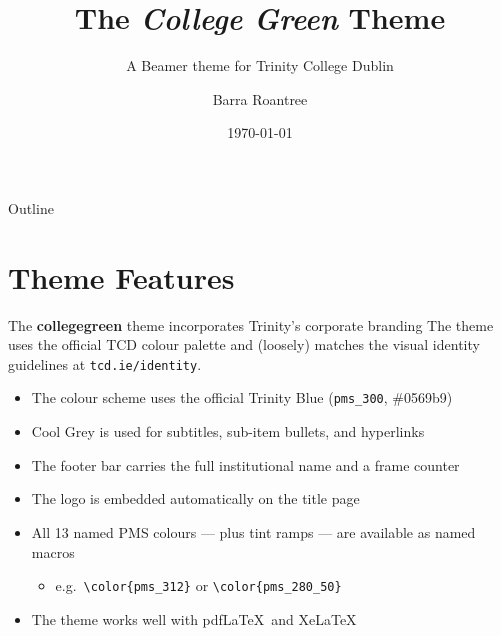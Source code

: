 \documentclass[aspectratio=169]{beamer}
\title{The \textit{College Green} Theme}
\subtitle{A Beamer theme for Trinity College Dublin}
\institute{Trinity College Dublin, the University of Dublin}
\author{Barra Roantree}
\date{\today}
\begin{document}
{
\begin{frame}
\titlepage
\end{frame}
}

\begin{frame}{Outline}
\tableofcontents
\end{frame}

\section{Theme Features}

\begin{frame}{The \textbf{collegegreen} theme incorporates Trinity's corporate branding}
The theme uses the official TCD colour palette and (loosely) matches the visual identity
guidelines at \texttt{tcd.ie/identity}.

\begin{itemize}
  \item The colour scheme uses the official Trinity Blue (\texttt{pms\_300}, \#0569b9)
  \item Cool Grey is used for subtitles, sub-item bullets, and hyperlinks
  \item The footer bar carries the full institutional name and a frame counter
  \item The logo is embedded automatically on the title page
  \item All 13 named PMS colours — plus tint ramps — are available as named macros
  \begin{itemize}
    \item e.g.\ \texttt{\textbackslash color\{pms\_312\}} or \texttt{\textbackslash color\{pms\_280\_50\}}
  \end{itemize}
  \item The theme works well with pdf\LaTeX\ and Xe\LaTeX
\end{itemize}
\end{frame}

\end{document}
